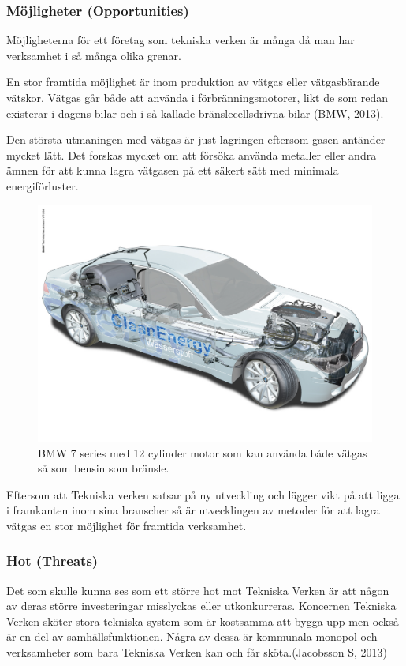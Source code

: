 \documentclass[10pt,a4paper]{article}
\begin{document}
\subsubsection{Möjligheter (Opportunities)}
Möjligheterna för ett företag som tekniska verken är många då man har verksamhet i så många olika grenar. 

En stor framtida möjlighet är inom produktion av vätgas eller vätgasbärande vätskor. Vätgas går både att använda i förbränningsmotorer, likt de som redan existerar i dagens bilar och i så kallade bränslecellsdrivna bilar (BMW, 2013).

Den största utmaningen med vätgas är just lagringen eftersom gasen antänder mycket lätt. Det forskas mycket om att försöka använda metaller eller andra ämnen för att kunna lagra vätgasen på ett säkert sätt med minimala energiförluster.

\begin{figure}[H] 
\centerline{\includegraphics[scale=0.14]{Bilder/bmwcar.jpg}}
\caption{BMW 7 series med 12 cylinder motor som kan använda både vätgas så som bensin som bränsle.}
\label{fig:bmw}
\end{figure}

Eftersom att Tekniska verken satsar på ny utveckling och lägger vikt på att ligga i framkanten inom sina branscher så är utvecklingen av metoder för att lagra vätgas en stor möjlighet för framtida verksamhet.

\subsubsection{Hot (Threats)}
Det som skulle kunna ses som ett större hot mot Tekniska Verken är
att någon av deras större investeringar misslyckas eller
utkonkurreras. Koncernen Tekniska Verken sköter stora tekniska system som är
kostsamma att bygga upp men också är en del av
samhällsfunktionen. Några av dessa är kommunala monopol och
verksamheter som bara Tekniska Verken kan och får sköta.(Jacobsson S, 2013) 
\end{document}

